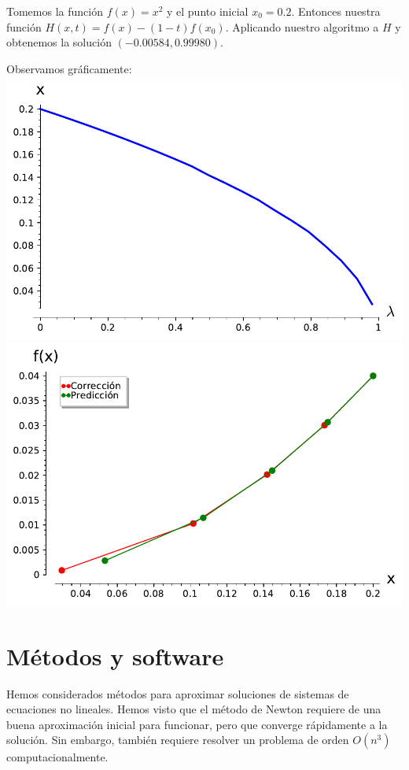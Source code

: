 \begin{example}
	Tomemos la función $f(x) = x^2$ y el punto inicial $x_0 = 0.2$. Entonces nuestra función $H(x,t) = f(x)-(1-t)f(x_0)$. Aplicando nuestro algoritmo a $H$ y obtenemos la solución $(-0.00584,0.99980)$.
	
	Observamos gráficamente:\\
	\includegraphics[scale=0.5]{imagenes/ejemplo2_continuacion.pdf}{\centering}
	\includegraphics[scale=0.5]{imagenes/ejemplo2_1_continuacion.pdf}{\centering}
	
\end{example}


\section{Métodos y software}


Hemos considerados métodos para aproximar soluciones de sistemas de ecuaciones no lineales. Hemos visto que el método de Newton requiere de una buena aproximación inicial para funcionar, pero que converge rápidamente a la solución. Sin embargo, también requiere resolver un problema de orden $O(n^3)$ computacionalmente.\\

